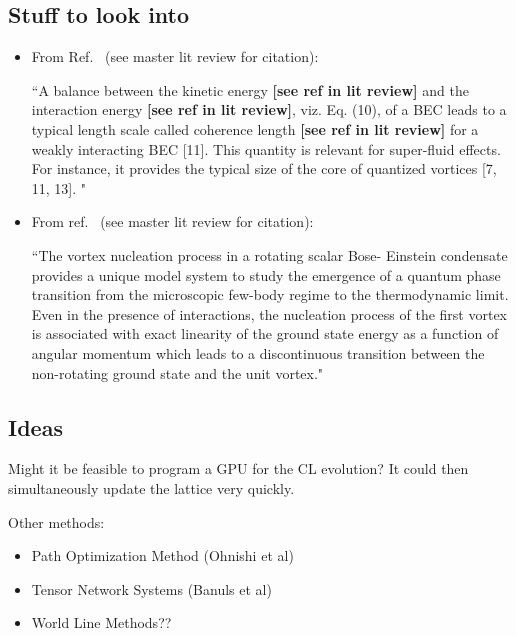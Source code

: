 \documentclass[../RotatingBosons.tex]{subfiles}
\begin{document}
\subsection{Stuff to look into}
\begin{itemize}
	\item From Ref.~\cite{1903.08672} (see master lit review for citation):

``A balance between the kinetic energy  {\bf [see ref in lit review]} and the interaction energy  {\bf [see ref in lit review]}, viz. Eq. (10), of a BEC leads to a typical length scale called coherence length {\bf [see ref in lit review]} for a weakly interacting BEC [11]. This
quantity is relevant for super-fluid effects. For instance, it provides the typical size of the core of quantized vortices [7, 11, 13]. "

	\item From ref.~\cite{2019arXiv191011461E} (see master lit review for citation):
	
``The vortex nucleation process in a rotating scalar Bose- Einstein condensate provides a unique model system to study the emergence of a quantum phase transition from the microscopic few-body regime to the thermodynamic limit. Even in the presence of interactions, the nucleation process of the first vortex is associated with exact linearity of the ground state energy as a function of angular momentum which leads to a discontinuous transition between the non-rotating ground state and the unit vortex."

\end{itemize}

\subsection{Ideas}
Might it be feasible to program a GPU for the CL evolution? It could then simultaneously update the lattice very quickly.

Other methods:
\begin{itemize}
	\item Path Optimization Method (Ohnishi et al)
	\item Tensor Network Systems (Banuls et al)
	\item World Line Methods??
\end{itemize}
\end{document}
